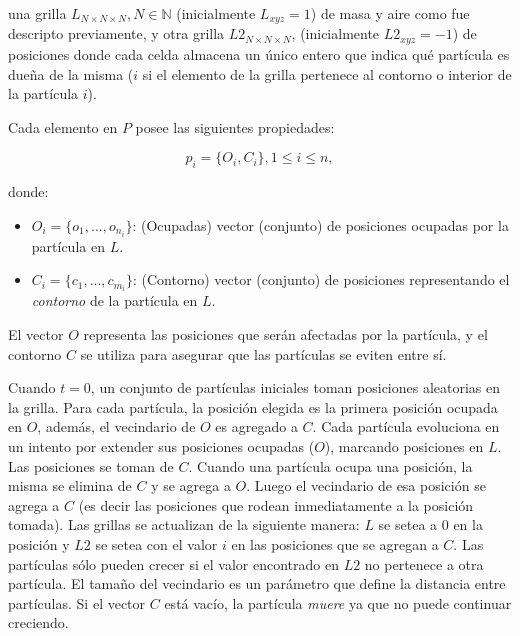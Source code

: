 \documentclass[oneside,a4paper,spanish,links]{amca}
\begin{document}
\noindent una grilla $L_{N\times N \times N}, N \in \mathbb{N} $ (inicialmente $L_{xyz}=1$) de masa y aire como fue descripto previamente, y otra grilla $L2_{N\times N \times N}$, (inicialmente $L2_{xyz}=-1$) de posiciones donde cada celda almacena un único entero que indica qu\'e part\'icula es due\~na de la misma ($i$ si el elemento de la grilla pertenece al contorno o interior de la part\'icula $i$).

Cada elemento en $P$ posee las siguientes propiedades:

\begin{equation}
  p_{i} = \{O_{i}, C_{i}\}, 1 \le i \le n,
\end{equation}

\noindent donde:

\begin{itemize}
\item $O_{i} = \{o_{1}, ... , o_{n_{i}}\}$: (Ocupadas) vector (conjunto) de posiciones ocupadas por la part\'icula en $L$.

\item $C_{i} = \{c_{1}, ... , c_{m_{i}}\}$: (Contorno) vector (conjunto) de posiciones representando el {\em contorno} de la part\'icula en $L$.
\end{itemize}

El vector $O$ representa las posiciones que ser\'an afectadas por la part\'icula, y el contorno $C$ se utiliza para asegurar que las part\'iculas se eviten entre s\'i.

Cuando $t = 0$, un conjunto de part\'iculas iniciales toman posiciones aleatorias en la grilla. Para cada partícula, la posici\'on elegida es la primera posici\'on ocupada en $O$, adem\'as, el vecindario de $O$ es agregado a $C$. Cada part\'icula evoluciona en un intento por extender sus posiciones ocupadas ($O$), marcando posiciones en $L$. Las posiciones se toman de $C$. Cuando una part\'icula ocupa una posici\'on, la misma se elimina de $C$ y se agrega a $O$. Luego el vecindario de esa posici\'on se agrega a $C$ (es decir las posiciones que rodean inmediatamente a la posici\'on tomada). Las grillas se actualizan de la siguiente manera: $L$ se setea a $0$ en la posici\'on y $L2$ se setea con el valor $i$ en las posiciones que se agregan a $C$. Las part\'iculas s\'olo pueden crecer si el valor encontrado en $L2$ no pertenece a otra part\'icula. El tama\~no del vecindario es un par\'ametro que define la distancia entre part\'iculas. Si el vector $C$ est\'a vac\'io, la part\'icula {\em muere} ya que no puede continuar creciendo.
\end{document}
